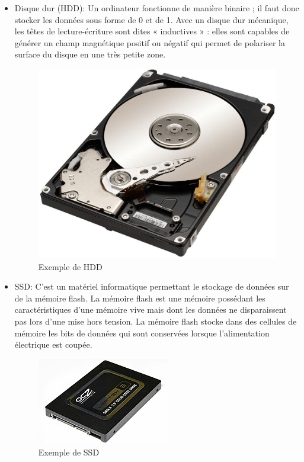 \documentclass[a4paper,12pt]{article}
\begin{document}
            \begin{itemize}
                \item Disque dur (HDD)\footnotemark[2] :
                    Un ordinateur fonctionne de manière binaire ; il faut donc stocker les données sous forme de 0 et de 1. Avec un disque dur mécanique, les têtes de lecture-écriture sont dites « inductives » : elles sont capables de générer un champ magnétique positif ou négatif qui permet de polariser la surface du disque en une très petite zone.\\
                        \begin{figure}[h!]
                            \centering
                            \includegraphics[scale=0.07]{disque_dur.jpg}
                            \caption{Exemple de HDD}
                            \label{fig: Exemple de HDD}
                        \end{figure}
                \item SSD\footnotemark[3] :
                    C'est un matériel informatique permettant le stockage de données sur de la mémoire flash. La mémoire flash est une mémoire possédant les caractéristiques d'une mémoire vive mais dont les données ne disparaissent pas lors d'une mise hors tension. La mémoire flash stocke dans des cellules de mémoire les bits de données qui sont conservées lorsque l'alimentation électrique est coupée.
                    \begin{figure}[h!]
                        \centering
                        \includegraphics[scale=0.4]{SSD.jpg}
                        \caption{Exemple de SSD}
                        \label{fig: Exemple de SSD}
                    \end{figure}
            \end{itemize}
            
\end{document}
